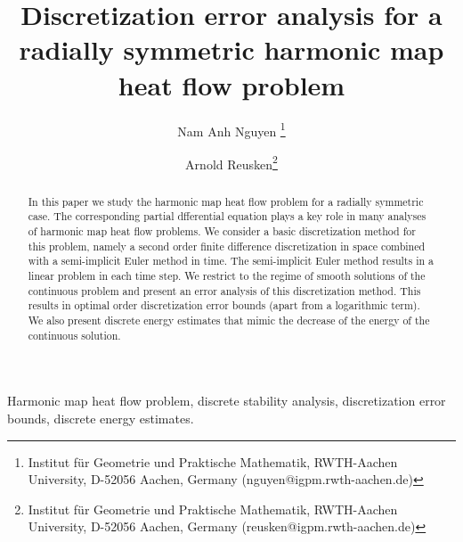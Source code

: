 \documentclass{siamltex}
\begin{document}
\title{Discretization error analysis for a radially symmetric harmonic map heat flow problem }
\author{Nam Anh Nguyen \thanks{Institut f\"ur Geometrie und Praktische  Mathematik, RWTH-Aachen
University, D-52056 Aachen, Germany (nguyen@igpm.rwth-aachen.de)} \and Arnold Reusken\thanks{Institut f\"ur Geometrie und Praktische  Mathematik, RWTH-Aachen
University, D-52056 Aachen, Germany (reusken@igpm.rwth-aachen.de)} 
}
\maketitle
%
\begin{abstract} 
In this paper we study the harmonic map heat flow problem for a radially symmetric case. The corresponding partial dfferential equation plays a key role in many analyses of  harmonic map heat flow problems. We consider  a basic discretization method for this problem, namely a second order finite difference discretization in space  combined with a semi-implicit Euler method in time. The semi-implicit Euler method results in a linear problem in each time step. We restrict to the regime of smooth solutions of the continuous problem and present an error analysis of this discretization method. This results in optimal order discretization error bounds (apart from a logarithmic term). We also present discrete energy estimates that mimic the decrease of the energy  of the continuous solution.  
\end{abstract}
\begin{keywords}  Harmonic map heat flow problem, discrete stability analysis, discretization error bounds, discrete energy estimates.
 \end{keywords}
\end{document}
